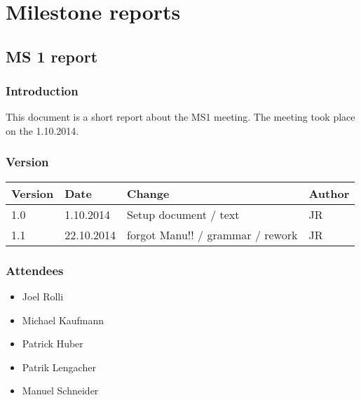 
\chapter{Milestone reports} %

\label{Milestone reports} %



\section{MS 1 report}

\subsection{Introduction}

This document is a short report about the MS1 meeting. The meeting took place on the 1.10.2014.

\subsection{Version}


\begin{tabular}{| p{1.5cm} | p{2cm} | p{9cm} | p{1.5cm} |}
    \hline
    Version & Date      & Change & Author \\ \hline
    1.0    & 1.10.2014        & Setup document / text                                        & JR \\ \hline
    1.1    & 22.10.2014        & forgot Manu!! / grammar / rework                                        & JR \\ \hline
\end{tabular}


\subsection{Attendees}
\begin{itemize}
\item Joel Rolli
\item Michael Kaufmann
\item Patrick Huber
\item Patrik Lengacher
\item Manuel Schneider
\end{itemize}


